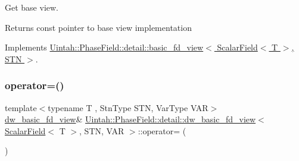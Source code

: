 Get base view. 

\begin{DoxyReturn}{Returns}
const pointer to base view implementation 
\end{DoxyReturn}


Implements \hyperlink{classUintah_1_1PhaseField_1_1detail_1_1basic__fd__view_3_01ScalarField_3_01T_01_4_00_01STN_01_4_a006d6f7c6fd81ff2c8d53f59656a23dc}{Uintah\+::\+Phase\+Field\+::detail\+::basic\+\_\+fd\+\_\+view$<$ Scalar\+Field$<$ T $>$, S\+T\+N $>$}.

\mbox{\label{classUintah_1_1PhaseField_1_1detail_1_1dw__basic__fd__view_3_01ScalarField_3_01T_01_4_00_01STN_00_01VAR_01_4_ae2fa9eab3d9f771513f111e8ba0fe27c}} 
\subsubsection{\texorpdfstring{operator=()}{operator=()}}
{\footnotesize\ttfamily template$<$typename T , Stn\+Type S\+TN, Var\+Type V\+AR$>$ \\
\hyperlink{classUintah_1_1PhaseField_1_1detail_1_1dw__basic__fd__view}{dw\+\_\+basic\+\_\+fd\+\_\+view}\& \hyperlink{classUintah_1_1PhaseField_1_1detail_1_1dw__basic__fd__view}{Uintah\+::\+Phase\+Field\+::detail\+::dw\+\_\+basic\+\_\+fd\+\_\+view}$<$ \hyperlink{structUintah_1_1PhaseField_1_1ScalarField}{Scalar\+Field}$<$ T $>$, S\+TN, V\+AR $>$\+::operator= (\begin{DoxyParamCaption}\item[{const \hyperlink{classUintah_1_1PhaseField_1_1detail_1_1dw__basic__fd__view}{dw\+\_\+basic\+\_\+fd\+\_\+view}$<$ \hyperlink{structUintah_1_1PhaseField_1_1ScalarField}{Scalar\+Field}$<$ T $>$, S\+TN, V\+AR $>$ \&}]{ }\end{DoxyParamCaption})\hspace{0.3cm}{\ttfamily [delete]}}



